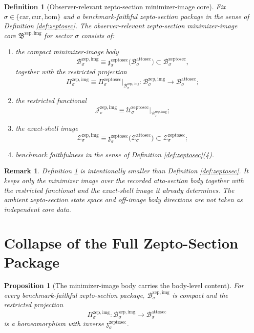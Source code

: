 \documentclass[11pt]{article}
\newcommand{\Car}{\mathrm{car}}
\newcommand{\Cur}{\mathrm{cur}}
\newcommand{\Hom}{\mathrm{hom}}
\newcommand{\AttoSectionBody}[1]{\mathcal B_{#1}^{\mathrm{attosec}}}
\newcommand{\AttoSectionShell}[1]{\mathcal Z_{#1}^{\mathrm{attosec}}}
\newcommand{\ZeptoSectionBody}[1]{\mathcal B_{#1}^{\mathrm{zeptosec}}}
\newcommand{\ZeptoSectionProj}[1]{\Pi_{#1}^{\mathrm{zeptosec}}}
\newcommand{\ZeptoSectionAttoMin}[1]{\mathfrak z_{#1}^{\mathrm{zeptosec}}}
\newcommand{\ZeptoSectionFunctional}[1]{\mathscr U_{#1}^{\mathrm{zeptosec}}}
\newcommand{\ZeptoSectionShell}[1]{\mathcal Z_{#1}^{\mathrm{zeptosec}}}
\newcommand{\ZeptoImageCore}{\mathfrak B^{\mathrm{zep,img}}}
\newcommand{\ZeptoImgBody}[1]{\mathcal B_{#1}^{\mathrm{zep,img}}}
\newcommand{\ZeptoImgProj}[1]{\Pi_{#1}^{\mathrm{zep,img}}}
\newcommand{\ZeptoImgFunctional}[1]{\mathscr J_{#1}^{\mathrm{zep,img}}}
\newcommand{\ZeptoImgShell}[1]{\mathcal Z_{#1}^{\mathrm{zep,img}}}
\newtheorem{definition}{Definition}
\newtheorem{proposition}{Proposition}
\newtheorem{remark}{Remark}
\begin{document}
\begin{definition}[Observer-relevant zepto-section minimizer-image core]
\label{def:imagecore}
Fix \(\sigma\in\{\Car,\Cur,\Hom\}\) and a benchmark-faithful zepto-section package in the sense of Definition \ref{def:zeptosec}. The \emph{observer-relevant zepto-section minimizer-image core} \(\ZeptoImageCore\) for sector \(\sigma\) consists of:
\begin{enumerate}
    \item the compact minimizer-image body
    \[
    \ZeptoImgBody{\sigma}
    \equiv
    \ZeptoSectionAttoMin{\sigma}\bigl(\AttoSectionBody{\sigma}\bigr)
    \subset
    \ZeptoSectionBody{\sigma},
    \]
    together with the restricted projection
    \[
    \ZeptoImgProj{\sigma}
    \equiv
    \ZeptoSectionProj{\sigma}\big|_{\ZeptoImgBody{\sigma}}
    :
    \ZeptoImgBody{\sigma}\to\AttoSectionBody{\sigma};
    \]
    \item the restricted functional
    \[
    \ZeptoImgFunctional{\sigma}
    \equiv
    \ZeptoSectionFunctional{\sigma}\big|_{\ZeptoImgBody{\sigma}};
    \]
    \item the exact-shell image
    \[
    \ZeptoImgShell{\sigma}
    \equiv
    \ZeptoSectionAttoMin{\sigma}\bigl(\AttoSectionShell{\sigma}\bigr)
    \subset
    \ZeptoSectionShell{\sigma};
    \]
    \item benchmark faithfulness in the sense of Definition \ref{def:zeptosec}(4).
\end{enumerate}
\end{definition}

\begin{remark}
Definition \ref{def:imagecore} is intentionally smaller than Definition \ref{def:zeptosec}. It keeps only the minimizer image over the recorded atto-section body together with the restricted functional and the exact-shell image it already determines. The ambient zepto-section state space and off-image body directions are not taken as independent core data.
\end{remark}

\section{Collapse of the Full Zepto-Section Package}

\begin{proposition}[The minimizer-image body carries the body-level content]
\label{prop:body}
For every benchmark-faithful zepto-section package, \(\ZeptoImgBody{\sigma}\) is compact and the restricted projection
\[
\ZeptoImgProj{\sigma}:\ZeptoImgBody{\sigma}\to\AttoSectionBody{\sigma}
\]
is a homeomorphism with inverse \(\ZeptoSectionAttoMin{\sigma}\).
\end{proposition}
\end{document}

